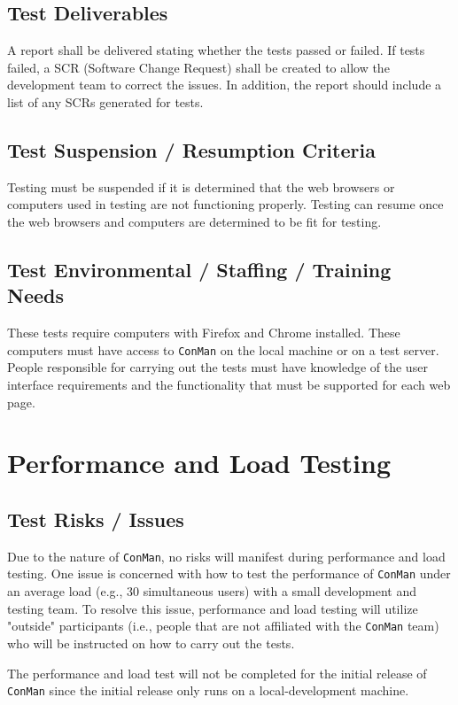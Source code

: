 \documentclass{article}
\begin{document}
\subsection{Test Deliverables}
A report shall be delivered stating whether the tests passed or failed. If tests 
failed, a SCR (Software Change Request) shall be created to allow the development 
team to correct the issues. In addition, the report should include a list of any 
SCRs generated for tests.

\subsection{Test Suspension / Resumption Criteria}
Testing must be suspended if it is determined that the web browsers or computers 
used in testing are not functioning properly. Testing can resume once the web 
browsers and computers are determined to be fit for testing. 

\subsection{Test Environmental / Staffing / Training Needs}
These tests require computers with Firefox and Chrome installed. These computers 
must have access to \texttt{ConMan} on the local machine or on a test server. People 
responsible for carrying out the tests must have knowledge of the user interface 
requirements and the functionality that must be supported for each web page.

\newpage
\section{Performance and Load Testing}
\subsection{Test Risks / Issues}
Due to the nature of \texttt{ConMan}, no risks will manifest during performance 
and load testing. 
One issue is concerned with how to test the performance of \texttt{ConMan} 
under an average load (e.g., 30 simultaneous users) with a small development and testing team. 
To resolve this issue, performance and load testing will utilize "outside" 
participants (i.e., people that are not affiliated with the 
\texttt{ConMan} team) who will be instructed on how to carry out the tests.

The performance and load test will not be completed for the initial release of \texttt{ConMan} since the initial release only runs on a local-development machine.
\end{document}
